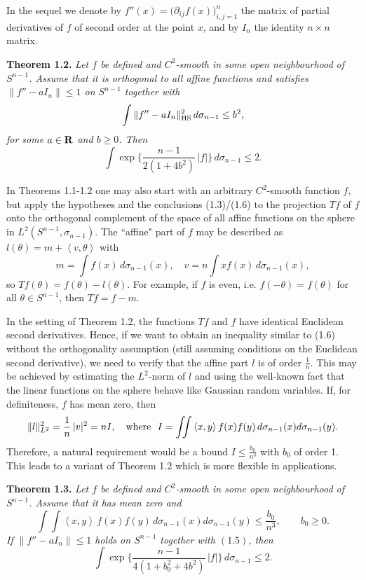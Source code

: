 \documentclass[reqno,12pt]{amsart}
\theoremstyle{plain}
\begin{document}
In the sequel we denote by $f''(x) = \big(\partial_{ij} f(x)\big)_{i,j=1}^n$
the matrix of partial derivatives of $f$ of second order at the point $x$, 
and by $I_n$ the identity $n \times n$ matrix.

\vskip5mm
{\bf Theorem 1.2.} {\it Let $f$ be defined and $C^2$-smooth in some open
neighbourhood of $S^{n-1}$. Assume that it is orthogonal to all affine 
functions and satisfies $\|f'' - a I_n\| \leq 1$ on $S^{n-1}$ together with
\begin{equation}
\int \|f'' - a I_n\|_{\rm HS}^2\, d\sigma_{n-1} \leq b^2,
\end{equation}
for some $a \in {{\bf R}}$ and $b \geq 0$. Then
\begin{equation}
\int \exp\Big\{\frac{n-1}{2(1+4b^2)}\, |f|\Big\}\, d\sigma_{n-1} \leq 2.
\end{equation}
}

\vskip2mm
In Theorems 1.1-1.2 one may also start with an arbitrary $C^2$-smooth function 
$f$, but apply the hypotheses and the conclusions (1.3)/(1.6) to the 
projection $Tf$ of $f$ onto the orthogonal complement of the space 
of all affine functions on the sphere in $L^2(S^{n-1},\sigma_{n-1})$. 
The ``affine" part of $f$ may be described as
$l(\theta) = m + \left<v,\theta\right>$ with
$$
m = \int f(x)\,d\sigma_{n-1}(x), \quad
v = n \int xf(x)\,d\sigma_{n-1}(x),
$$
so $Tf(\theta) = f(\theta) - l(\theta)$. For example, if $f$ is even, i.e.
$f(-\theta) = f(\theta)$ for all $\theta \in S^{n-1}$, then
$Tf = f - m$.

In the setting of Theorem 1.2, the functions $Tf$ and $f$ have
identical Euclidean second derivatives. Hence, if we want to obtain an
inequality similar to (1.6) without the orthogonality assumption (still 
assuming conditions on the Euclidean second derivative), we need to
verify that the affine part $l$ is of order $\frac{1}{n}$.
This may be achieved by estimating the $L^2$-norm of $l$ and using the 
well-known fact that the linear functions on the sphere behave like 
Gaussian random variables. If, for definiteness, $f$ has mean zero, then
$$
\|l\|_{L^2}^2 = \frac{1}{n}\,|v|^2 = nI, \quad {\rm where} \ \ 
I = \int\!\!\! \int
\left<x,y\right> f(x)f(y)\,d\sigma_{n-1}(x)d\sigma_{n-1}(y).
$$
Therefore, a natural requirement would be a bound $I \leq \frac{b_0}{n^3}$ 
with $b_0$ of order 1. This leads to a variant of Theorem 1.2 
which is more flexible in applications.

\vskip5mm
{\bf Theorem 1.3.} {\it Let $f$ be defined and $C^2$-smooth in some open
neighbourhood of $S^{n-1}$. Assume that it has mean zero and 
$$
\int\!\!\! \int\left<x,y\right>\,f(x)f(y)\,d\sigma_{n-1}(x)d\sigma_{n-1}(y)
\leq \frac{b_0}{n^3}, \qquad b_0 \geq 0.
$$
If $\|f'' - a I_n\| \leq 1$ holds on $S^{n-1}$ together with $(1.5)$, then
$$
\int \exp\Big\{\frac{n-1}{4(1+b_0^2+4b^2)}\, |f|\Big\}\, d\sigma_{n-1} \leq 2.
$$
}
\end{document}
